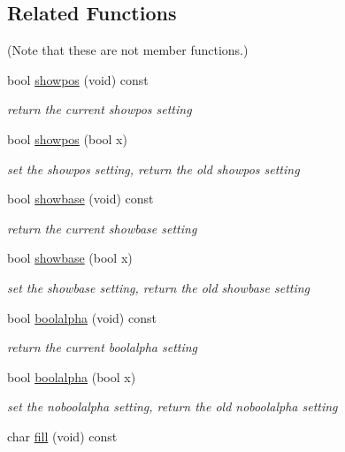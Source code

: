 \subsection*{Related Functions}
(Note that these are not member functions.) \begin{DoxyCompactItemize}
\item 
bool \hyperlink{classhwlib_1_1ostream_a5b8e4c021711ab0fbbefcd2df29c03a7}{showpos} (void) const 
\begin{DoxyCompactList}\small\item\em return the current showpos setting \end{DoxyCompactList}\item 
bool \hyperlink{classhwlib_1_1ostream_a63eb8b78e5a4a3250043b4b9ecb35f16}{showpos} (bool x)
\begin{DoxyCompactList}\small\item\em set the showpos setting, return the old showpos setting \end{DoxyCompactList}\item 
bool \hyperlink{classhwlib_1_1ostream_aa47993e8c6771ed093859416133b3724}{showbase} (void) const 
\begin{DoxyCompactList}\small\item\em return the current showbase setting \end{DoxyCompactList}\item 
bool \hyperlink{classhwlib_1_1ostream_ad3290e2669fd1ced136efc657f4478a2}{showbase} (bool x)
\begin{DoxyCompactList}\small\item\em set the showbase setting, return the old showbase setting \end{DoxyCompactList}\item 
bool \hyperlink{classhwlib_1_1ostream_aa4ad6c4c344926b02b165e89bddb98b5}{boolalpha} (void) const 
\begin{DoxyCompactList}\small\item\em return the current boolalpha setting \end{DoxyCompactList}\item 
bool \hyperlink{classhwlib_1_1ostream_a4b94d035da5b074afee5fdef06dcf737}{boolalpha} (bool x)
\begin{DoxyCompactList}\small\item\em set the noboolalpha setting, return the old noboolalpha setting \end{DoxyCompactList}\item 
char \hyperlink{classhwlib_1_1ostream_a11cfd99e60bf22ace9e11c40da61d3ec}{fill} (void) const 

\end{DoxyCompactItemize}
